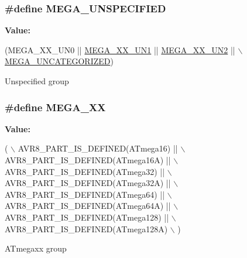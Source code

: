 \subsubsection[{M\+E\+G\+A\+\_\+\+U\+N\+S\+P\+E\+C\+I\+F\+I\+E\+D}]{\setlength{\rightskip}{0pt plus 5cm}\#define M\+E\+G\+A\+\_\+\+U\+N\+S\+P\+E\+C\+I\+F\+I\+E\+D}\label{group__mega__part__macros__group_gaabb3078f36ad4d875915bd54fa46f337}
{\bfseries Value\+:}
\begin{DoxyCode}
(MEGA\_XX\_UN0 || \hyperlink{group__mega__part__macros__group_gaad35e34280ef078dec0cc18c3ea6d3f6}{MEGA\_XX\_UN1} || \hyperlink{group__mega__part__macros__group_ga5f4566d4ddaa3cee92d4c78162594f2d}{MEGA\_XX\_UN2} || \hyperlink{group__mega__part__macros__group_ga9252d02a9216d5e9bf94000667ad6cb1}{\(\backslash\)}
\hyperlink{group__mega__part__macros__group_ga9252d02a9216d5e9bf94000667ad6cb1}{    MEGA\_UNCATEGORIZED})
\end{DoxyCode}
Unspecified group \hypertarget{group__mega__part__macros__group_gabdf992a84b61d19055315a473c2e0f20}{}
\subsubsection[{M\+E\+G\+A\+\_\+\+X\+X}]{\setlength{\rightskip}{0pt plus 5cm}\#define M\+E\+G\+A\+\_\+\+X\+X}\label{group__mega__part__macros__group_gabdf992a84b61d19055315a473c2e0f20}
{\bfseries Value\+:}
\begin{DoxyCode}
( \(\backslash\)
        AVR8\_PART\_IS\_DEFINED(ATmega16)   || \(\backslash\)
        AVR8\_PART\_IS\_DEFINED(ATmega16A)  || \(\backslash\)
        AVR8\_PART\_IS\_DEFINED(ATmega32)   || \(\backslash\)
        AVR8\_PART\_IS\_DEFINED(ATmega32A)  || \(\backslash\)
        AVR8\_PART\_IS\_DEFINED(ATmega64)   || \(\backslash\)
        AVR8\_PART\_IS\_DEFINED(ATmega64A)  || \(\backslash\)
        AVR8\_PART\_IS\_DEFINED(ATmega128)  || \(\backslash\)
        AVR8\_PART\_IS\_DEFINED(ATmega128A) \(\backslash\)
        )
\end{DoxyCode}
A\+Tmegaxx group \hypertarget{group__mega__part__macros__group_gad59dc6f3c3dc91c94cd1673448135b83}{}

